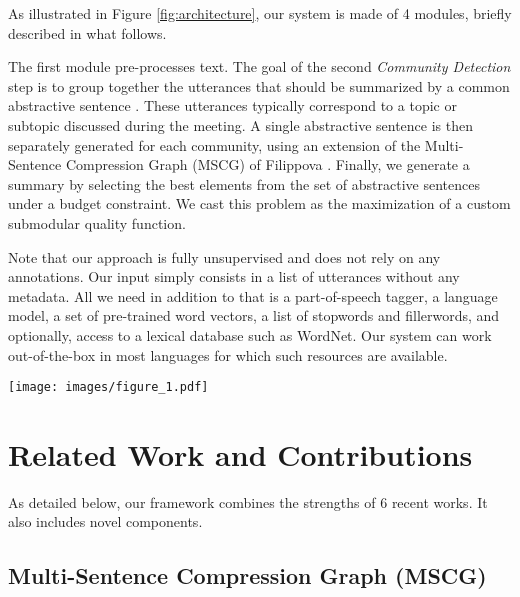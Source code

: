\documentclass[11pt,a4paper]{article}
\begin{document}
As illustrated in Figure \ref{fig:architecture}, our system is made of 4 modules, briefly described in what follows.  

The first module pre-processes text. The goal of the second \textit{Community Detection} step is to group together the utterances that should be summarized by a common abstractive sentence \cite{murray2012using}. These utterances typically correspond to a topic or subtopic discussed during the meeting. A single abstractive sentence is then separately generated for each community, using an extension of the Multi-Sentence Compression Graph (MSCG) of Filippova . Finally, we generate a summary by selecting the best elements from the set of abstractive sentences under a budget constraint. We cast this problem as the maximization of a custom submodular quality function.

Note that our approach is fully unsupervised and does not rely on any annotations. Our input simply consists in a list of utterances without any metadata. All we need in addition to that is a part-of-speech tagger, a language model, a set of pre-trained word vectors, a list of stopwords and fillerwords, and optionally, access to a lexical database such as WordNet. Our system can work out-of-the-box in most languages for which such resources are available.

\begin{figure*}[ht]
\centering
\texttt{[image: images/figure\_1.pdf]}
\caption{Overarching system pipeline.}
\label{fig:architecture}
\end{figure*}

\section{Related Work and Contributions} \label{sec:related_work}
As detailed below, our framework combines the strengths of 6 recent works. It also includes novel components.

\subsection{Multi-Sentence Compression Graph (MSCG) \cite{filippova2010multi}}
\end{document}
